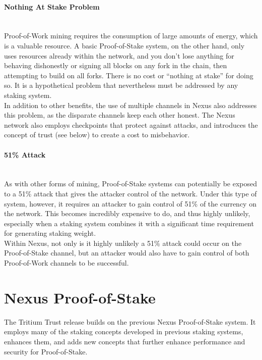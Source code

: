 \documentclass[11pt]{article}
\begin{document}
\paragraph{Nothing At Stake Problem} ~\\
Proof-of-Work mining requires the consumption of large amounts of energy, which is a valuable resource. A basic Proof-of-Stake system, on the other hand, only uses resources already within the network, and you don’t lose anything for behaving dishonestly or signing all blocks on any fork in the chain, then attempting to build on all forks. There is no cost or “nothing at stake” for doing so. It is a hypothetical problem that nevertheless must be addressed by any staking system.\\

\noindent In addition to other benefits, the use of multiple channels in Nexus also addresses this problem, as the disparate channels keep each other honest. The Nexus network also employs checkpoints that protect against attacks, and introduces the concept of trust (see below) to create a cost to misbehavior. 

\paragraph{51\% Attack} ~\\
As with other forms of mining, Proof-of-Stake systems can potentially be exposed to a 51\% attack that gives the attacker control of the network. Under this type of system, however, it requires an attacker to gain control of 51\% of the currency on the network. This becomes incredibly expensive to do, and thus highly unlikely, especially when a staking system combines it with a significant time requirement for generating staking weight.\\

\noindent Within Nexus, not only is it highly unlikely a 51\% attack could occur on the Proof-of-Stake channel, but an attacker would also have to gain control of both Proof-of-Work channels to be successful. \\

\bigskip

\section{Nexus Proof-of-Stake}
The Tritium Trust release builds on the previous Nexus Proof-of-Stake system. It employs many of the staking concepts developed in previous staking systems, enhances them, and adds new concepts that further enhance performance and security for Proof-of-Stake.\\
\end{document}
